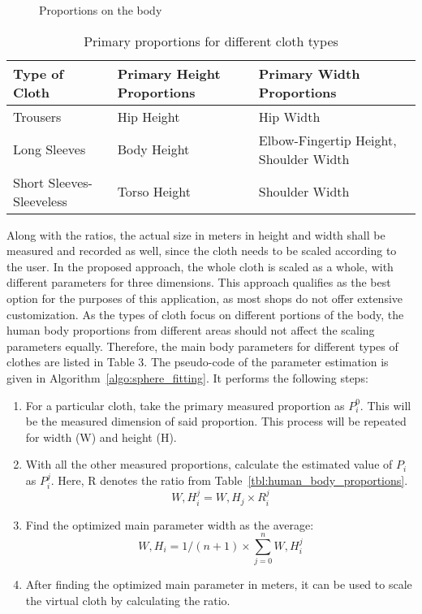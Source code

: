 \begin{figure}[h]
\centerline{}
\caption{Proportions on the body}
\label{fig:body_proportions}
\end{figure}

\begin{table}
\center
\begin{tabular}{ | p{3cm} | p{3.5cm} | p{3.5cm}  |}
\hline
\textbf{Type of Cloth} & \textbf{Primary Height Proportions} & \textbf{Primary Width Proportions}  \\ \hline
Trousers & Hip Height & Hip Width \\ \hline
Long Sleeves & Body Height & Elbow-Fingertip Height, Shoulder Width \\ \hline
Short Sleeves-Sleeveless & Torso Height & Shoulder Width \\ 
\hline
\end{tabular}
\caption{Primary proportions for different cloth types}
\label{tbl:primary_proportions}
\end{table}

Along with the ratios, the actual size in meters in height and width shall be measured and recorded as well, since the cloth needs to be scaled according to the user. In the proposed approach, the whole cloth is scaled as a whole, with different parameters for three dimensions. This approach qualifies as the best option for the purposes of this application, as most shops do not offer extensive customization. As the types of cloth focus on different portions of the body, the human body proportions from different areas should not affect the scaling parameters equally. Therefore, the main body parameters for different types of clothes are listed in Table 3. The pseudo-code of the parameter estimation is given in Algorithm~\ref{algo:sphere_fitting}. It performs the following steps:

\begin{enumerate}
\item For a particular cloth, take the primary measured proportion as $P_i^0$. This will be the measured dimension of said proportion. 
This process will be repeated for width (W) and height (H).
\item With all the other measured proportions, calculate the estimated value of $P_i$ as $P_i^j$. Here, R denotes the ratio from Table~\ref{tbl:human_body_proportions}.
\begin{equation}
W,H_i^j=W,H_j \times R_i^j
\label{eqn:proportion_estimation}
\end{equation}
\item Find the optimized main parameter width as the average:
\begin{equation}
W,H_i=1/(n+1) \times \sum\limits_{j=0}^n W,H_i^j
\label{eqn:optimized_parameter}
\end{equation}
\item After finding the optimized main parameter in meters, it can be used to scale the virtual cloth by calculating the ratio.
\end{enumerate}


